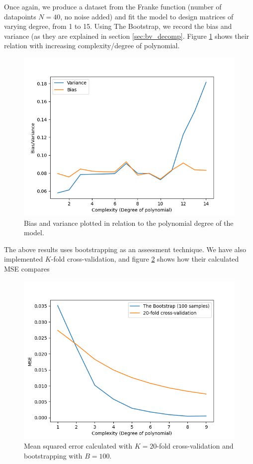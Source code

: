 \documentclass[../main.tex]{subfiles}
\begin{document}
Once again, we produce a dataset from the Franke function (number of datapoints $N=40$, no noise added) and fit the model to design matrices of varying degree, from 1 to 15. Using The Bootstrap, we record the bias and variance (as they are explained in section \ref{sec:bv_decomp}. Figure \ref{fig:result_bias_variance} shows their relation with increasing complexity/degree of polynomial. 

\begin{figure}[h]
    \centering
    \includegraphics[width=\textwidth]{../assets/var.png}
    \caption{Bias and variance plotted in relation to the polynomial degree of the model.}
    \label{fig:result_bias_variance}
\end{figure}

The above results uses bootstrapping as an assessment technique. We have also implemented $K$-fold cross-validation, and figure \ref{fig:result_cv_boot_mse} shows how their calculated MSE compares

\begin{figure}[h]
    \centering
    \includegraphics[width=\textwidth]{../assets/cv_boot_mse.png}
    \caption{Mean squared error calculated with $K=20$-fold cross-validation and bootstrapping with $B=100$.}
    \label{fig:result_cv_boot_mse}
\end{figure}
\end{document}
